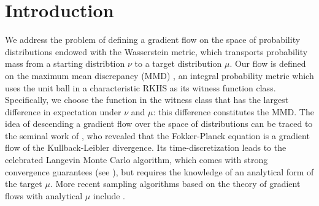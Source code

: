 \section{Introduction}




We address the problem of defining a gradient flow  on the space of probability distributions endowed with the Wasserstein metric, which transports probability mass from a starting distribtion $\nu$ to a target distribution $\mu$.   Our flow is defined on the maximum mean discrepancy (MMD) \cite{gretton2012kernel}, an integral probability metric \cite{Mueller97} which uses the unit ball in a characteristic RKHS \cite{sriperumbudur2010hilbert} as its witness function class.
Specifically, we choose the function in the witness class that has the largest difference in expectation under $\nu$ and $\mu$: this difference constitutes the MMD.
The idea of descending a gradient flow over the space of distributions can be traced to the seminal work of \cite{jordan1998variational}, who revealed that the Fokker-Planck equation is a gradient flow of the Kullback-Leibler divergence. Its time-discretization leads to the celebrated Langevin Monte Carlo algorithm, which comes with strong convergence guarantees  (see \cite{durmus2018analysis}), but requires the knowledge of an analytical form of the target $\mu$.  More recent sampling algorithms based on the theory of gradient flows with analytical $\mu$ include \cite{liu2017stein, csimcsekli2018sliced}.







